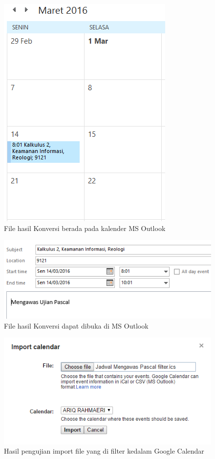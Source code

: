 			\begin{figure}[H]
			\centering
			\includegraphics[scale=0.8]{Gambar/hasilOutlook2}
			\caption{File hasil Konversi berada pada kalender MS Outlook }
			\label{fig:hasilOutlook2}
			\end{figure}
			
			\begin{figure}[H]
			\centering
			\includegraphics[scale=0.8]{Gambar/hasilOutlook}
			\caption{File hasil Konversi dapat dibuka di MS Outlook }
			\label{fig:hasilOutlook}
			\end{figure}
		

			\begin{figure}[H]
			\centering
			\includegraphics[scale=0.8]{Gambar/importGCFilter}
			\caption{Hasil pengujian import file yang di filter kedalam Google Calendar }
			\label{fig:importGCFilter}
			\end{figure}
			
